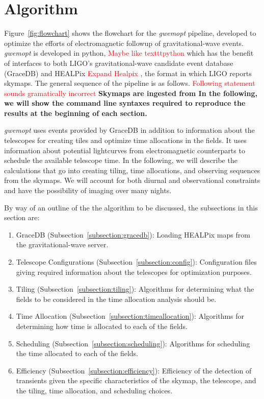 \documentclass[twocolumn]{aastex62}
\begin{document}
\section{Algorithm}
\label{sec:algorithm}

Figure~\ref{fig:flowchart} shows the flowchart for the \emph{gwemopt} pipeline, developed to optimize the efforts of electromagnetic followup of gravitational-wave events.  \emph{gwemopt} is developed in python,\textcolor{red}{ Maybe like texttt{python}} which has the benefit of interfaces to both LIGO's gravitational-wave candidate event database (GraceDB) and HEALPix \textcolor{red}{Expand Healpix} \citep{GoHi2005}, the format in which LIGO reports skymaps. The general sequence of the pipeline is as follows. \textcolor{red}{Following statement sounds gramatically incorrect} \textbf{Skymaps are ingested from 
In the following, we will show the command line syntaxes required to reproduce the results at the beginning of each section.}

\emph{gwemopt} uses events provided by GraceDB in addition to information about the telescopes for creating tiles and optimize time allocations in the fields.
It uses information about potential lightcurves from electromagnetic counterparts to schedule the available telescope time.
In the following, we will describe the calculations that go into creating tiling, time allocations, and observing sequences from the skymaps.
We will account for both diurnal and observational constraints and have the possibility of imaging over many nights.

By way of an outline of the the algorithm to be discussed, the subsections in this section are:
\begin{enumerate}
\item GraceDB (Subsection~\ref{subsection:gracedb}): Loading HEALPix maps from the gravitational-wave server.
\item Telescope Configurations (Subsection~\ref{subsection:config}): Configuration files giving required information about the telescopes for optimization purposes.
\item Tiling (Subsection~\ref{subsection:tiling}): Algorithms for determining what the fields to be considered in the time allocation analysis should be.
\item Time Allocation (Subsection~\ref{subsection:timeallocation}): Algorithms for determining how time is allocated to each of the fields.
\item Scheduling (Subsection~\ref{subsection:scheduling}): Algorithms for scheduling the time allocated to each of the fields.
\item Efficiency (Subsection~\ref{subsection:efficiency}): Efficiency of the detection of transients given the specific characteristics of the skymap, the telescope, and the tiling, time allocation, and scheduling choices.
\end{enumerate}
\end{document}
